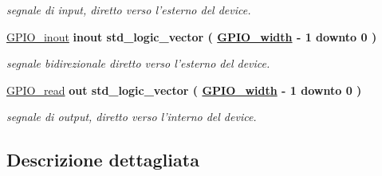 \begin{DoxyCompactItemize}
\begin{DoxyCompactList}\small\item\em segnale di input, diretto verso l'esterno del device. \end{DoxyCompactList}\item 
\hypertarget{group___g_p_i_o-array_ga8829699d739ef35a4c5da396ffd38387}{\hyperlink{group___g_p_i_o-array_ga8829699d739ef35a4c5da396ffd38387}{G\+P\+I\+O\+\_\+inout}  {\bfseries {\bfseries \textcolor{vhdlchar}{inout}\textcolor{vhdlchar}{ }}} {\bfseries \textcolor{vhdlchar}{std\+\_\+logic\+\_\+vector}\textcolor{vhdlchar}{ }\textcolor{vhdlchar}{(}\textcolor{vhdlchar}{ }\textcolor{vhdlchar}{ }\textcolor{vhdlchar}{ }\textcolor{vhdlchar}{ }{\bfseries \hyperlink{group___g_p_i_o-array_ga0b52ca75e9a6093b2b60d5e851803069}{G\+P\+I\+O\+\_\+width}} \textcolor{vhdlchar}{-\/}\textcolor{vhdlchar}{ } \textcolor{vhdldigit}{1} \textcolor{vhdlchar}{ }\textcolor{vhdlchar}{downto}\textcolor{vhdlchar}{ }\textcolor{vhdlchar}{ } \textcolor{vhdldigit}{0} \textcolor{vhdlchar}{ }\textcolor{vhdlchar}{)}\textcolor{vhdlchar}{ }} }\label{group___g_p_i_o-array_ga8829699d739ef35a4c5da396ffd38387}

\begin{DoxyCompactList}\small\item\em segnale bidirezionale diretto verso l'esterno del device. \end{DoxyCompactList}\item 
\hypertarget{group___g_p_i_o-array_gafbe6792efd02cef42af7717592c1b04a}{\hyperlink{group___g_p_i_o-array_gafbe6792efd02cef42af7717592c1b04a}{G\+P\+I\+O\+\_\+read}  {\bfseries {\bfseries \textcolor{vhdlchar}{out}\textcolor{vhdlchar}{ }}} {\bfseries \textcolor{vhdlchar}{std\+\_\+logic\+\_\+vector}\textcolor{vhdlchar}{ }\textcolor{vhdlchar}{(}\textcolor{vhdlchar}{ }\textcolor{vhdlchar}{ }\textcolor{vhdlchar}{ }\textcolor{vhdlchar}{ }{\bfseries \hyperlink{group___g_p_i_o-array_ga0b52ca75e9a6093b2b60d5e851803069}{G\+P\+I\+O\+\_\+width}} \textcolor{vhdlchar}{-\/}\textcolor{vhdlchar}{ } \textcolor{vhdldigit}{1} \textcolor{vhdlchar}{ }\textcolor{vhdlchar}{downto}\textcolor{vhdlchar}{ }\textcolor{vhdlchar}{ } \textcolor{vhdldigit}{0} \textcolor{vhdlchar}{ }\textcolor{vhdlchar}{)}\textcolor{vhdlchar}{ }} }\label{group___g_p_i_o-array_gafbe6792efd02cef42af7717592c1b04a}

\begin{DoxyCompactList}\small\item\em segnale di output, diretto verso l'interno del device. \end{DoxyCompactList}\end{DoxyCompactItemize}


\subsection{Descrizione dettagliata}
